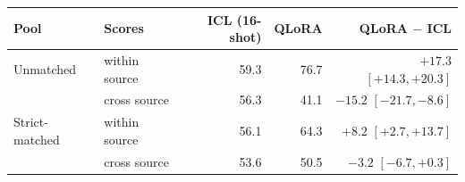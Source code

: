 \begin{tabular}{@{}llrrr@{}}
\toprule
Pool & Scores & ICL (16-shot) & QLoRA & QLoRA $-$ ICL \\
\midrule
Unmatched & within source & 59.3 & 76.7 & $+17.3$ $[+14.3,+20.3]$ \\
 & cross source & 56.3 & 41.1 & $-15.2$ $[-21.7,-8.6]$ \\
Strict-matched & within source & 56.1 & 64.3 & $+8.2$ $[+2.7,+13.7]$ \\
 & cross source & 53.6 & 50.5 & $-3.2$ $[-6.7,+0.3]$ \\
\bottomrule
\end{tabular}
